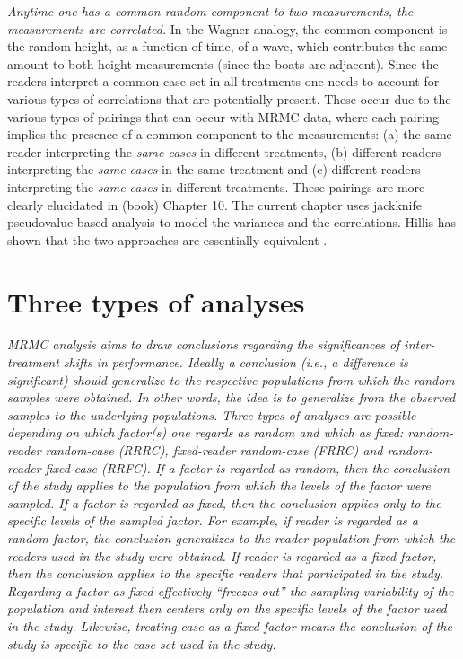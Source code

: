 \documentclass[
]{book}
\begin{document}
\emph{Anytime one has a common random component to two measurements, the measurements are correlated.} In the Wagner analogy, the common component is the random height, as a function of time, of a wave, which contributes the same amount to both height measurements (since the boats are adjacent). Since the readers interpret a common case set in all treatments one needs to account for various types of correlations that are potentially present. These occur due to the various types of pairings that can occur with MRMC data, where each pairing implies the presence of a common component to the measurements: (a) the same reader interpreting the \emph{same cases} in different treatments, (b) different readers interpreting the \emph{same cases} in the same treatment and (c) different readers interpreting the \emph{same cases} in different treatments. These pairings are more clearly elucidated in (book) Chapter 10. The current chapter uses jackknife pseudovalue based analysis to model the variances and the correlations. Hillis has shown that the two approaches are essentially equivalent \citep{RN1866}.

\hypertarget{DBMAnalysisBkgrnd-threeAnalyses}{%
\section{Three types of analyses}\label{DBMAnalysisBkgrnd-threeAnalyses}}

\emph{MRMC analysis aims to draw conclusions regarding the significances of inter-treatment shifts in performance. Ideally a conclusion (i.e., a difference is significant) should generalize to the respective populations from which the random samples were obtained. In other words, the idea is to generalize from the observed samples to the underlying populations. Three types of analyses are possible depending on which factor(s) one regards as random and which as fixed: random-reader random-case (RRRC), fixed-reader random-case (FRRC) and random-reader fixed-case (RRFC). If a factor is regarded as random, then the conclusion of the study applies to the population from which the levels of the factor were sampled. If a factor is regarded as fixed, then the conclusion applies only to the specific levels of the sampled factor. For example, if reader is regarded as a random factor, the conclusion generalizes to the reader population from which the readers used in the study were obtained. If reader is regarded as a fixed factor, then the conclusion applies to the specific readers that participated in the study. Regarding a factor as fixed effectively ``freezes out'' the sampling variability of the population and interest then centers only on the specific levels of the factor used in the study. Likewise, treating case as a fixed factor means the conclusion of the study is specific to the case-set used in the study.}
\end{document}
